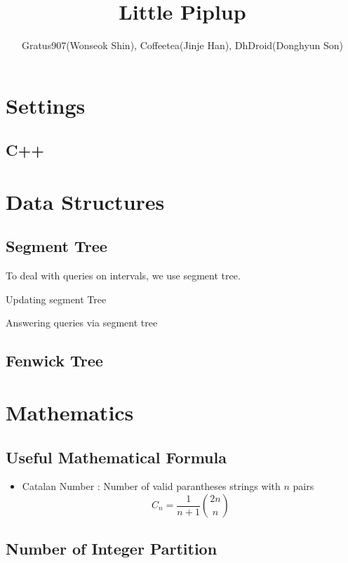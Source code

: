 \documentclass[landscape,8pt]{article}
\title{\Huge{\textsf{Little Piplup}}}
\author{Gratus907(Wonseok Shin), Coffeetea(Jinje Han), DhDroid(Donghyun Son)}
\date{ }
\begin{document}
\maketitle
\begin{multicols}{2}\raggedcolumns
\tableofcontents
\pagebreak

\section{Settings}

  \subsection{C++}

\section{Data Structures}
  \subsection{Segment Tree}
     To deal with queries on intervals, we use segment tree.
     
     Updating segment Tree
     
     Answering queries via segment tree
     
  \subsection{Fenwick Tree}
\columnbreak
  \section{Mathematics}
  \subsection{Useful Mathematical Formula}
    \begin{itemize}
      \item Catalan Number : Number of valid parantheses strings with $n$ pairs
      \[
      C_n = \frac{1}{n+1}\binom{2n}{n}
      \]
    \end{itemize}
  \subsection{Number of Integer Partition}
    


\end{multicols}
\end{document}
